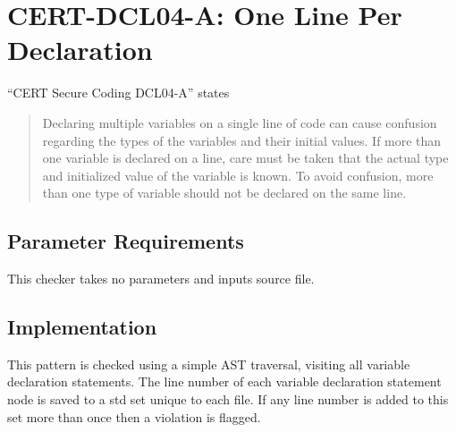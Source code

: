 %
%

\section{CERT-DCL04-A: One Line Per Declaration}
\label{OneLinePerDeclaration::overview}
``CERT Secure Coding DCL04-A'' states
\begin{quote}
Declaring multiple variables on a single line of code can cause confusion regarding the types of the variables and their initial values. If more than one variable is declared on a line, care must be taken that the actual type and initialized value of the variable is known. To avoid confusion, more than one type of variable should not be declared on the same line.
\end{quote}

\subsection{Parameter Requirements}
This checker takes no parameters and inputs source file.

\subsection{Implementation}
This pattern is checked using a simple AST traversal, visiting all variable declaration statements. The line number of each variable declaration statement node is saved to a std set unique to each file. If any line number is added to this set more than once then a violation is flagged.

